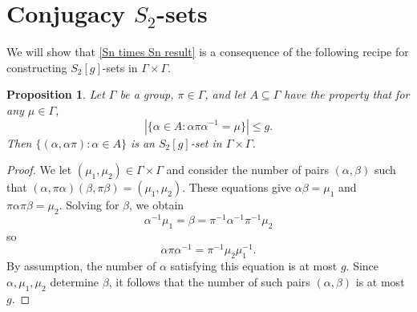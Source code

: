 \documentclass[12pt]{article}
\newtheorem{prop}{Proposition}
\begin{document}
\section{Conjugacy $S_2$-sets} \label{Conjugacy section}

We will show that \autoref{Sn times Sn result} is a consequence of the following recipe for constructing $S_2[g]$-sets in $\Gamma\times\Gamma$.

\begin{prop} \label{recipe}
    Let $\Gamma$ be a group, $\pi\in\Gamma$, and let $A\subseteq\Gamma$ have the property that for any $\mu\in\Gamma$,
    $$|\{\alpha\in A:\alpha\pi\alpha^{-1}=\mu\}|\le g.$$
    Then $\{(\alpha,\alpha\pi):\alpha\in A\}$ is an $S_2[g]$-set in $\Gamma\times\Gamma$.
\end{prop}
\begin{proof}
    We let $(\mu_1,\mu_2)\in\Gamma\times\Gamma$ and consider the number of pairs $(\alpha,\beta)$ such that $(\alpha,\pi\alpha)(\beta,\pi\beta)=(\mu_1,\mu_2)$. These equations give
    $\alpha\beta=\mu_1$ and $\pi\alpha\pi\beta=\mu_2$. Solving for $\beta$, we obtain $$\alpha^{-1}\mu_1=\beta=\pi^{-1}\alpha^{-1}\pi^{-1}\mu_2$$
    so
    $$\alpha\pi\alpha^{-1}=\pi^{-1}\mu_2\mu_1^{-1}.$$
    By assumption, the number of $\alpha$ satisfying this equation is at most $g$. Since $\alpha,\mu_1,\mu_2$ determine $\beta$, it follows that the number of such pairs $(\alpha,\beta)$ is at most $g$.
\end{proof}
\end{document}
